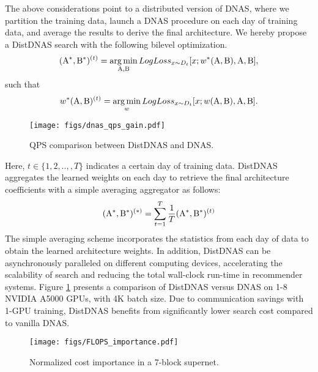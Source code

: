  The above considerations point to a distributed version of DNAS, where we partition the training data, launch a DNAS procedure on each day of training data, and average the results to derive the final architecture.
 We hereby propose a DistDNAS search with the following bilevel optimization.
\begin{equation}
\small
    (\mathrm{A}^{*}, \mathrm{B}^{*})^{(t)} = \operatorname*{arg\,min}_{\mathrm{A}, \mathrm{B}} LogLoss_{x \sim D_{t}}[x; w^{*}(\mathrm{A}, \mathrm{B}), \mathrm{A}, \mathrm{B}],
\end{equation}
such that
\begin{equation}
\small
    w^{*}(\mathrm{A}, \mathrm{B})^{(t)} = \operatorname*{arg\,min}_{w} LogLoss_{x \sim D_{t}}[x; w(\mathrm{A}, \mathrm{B}), \mathrm{A}, \mathrm{B}].
\end{equation}


\begin{figure}[t]
    \begin{center}
    \texttt{[image: figs/dnas\_qps\_gain.pdf]}
    \vspace{-1em}
    \caption{QPS comparison between DistDNAS and DNAS.}
    \label{fig:dnas_qps}
    \end{center}
    \vspace{-1em}
\end{figure}

Here, $t \in \{1, 2, ..,, T\}$ indicates a certain day of training data. 
DistDNAS aggregates the learned weights on each day to retrieve the final architecture coefficients with a simple averaging aggregator as follows:
\begin{equation}
\small
    (\mathrm{A}^{*}, \mathrm{B}^{*})^{(*)} = \sum_{t=1}^{T} \frac{1}{T}(\mathrm{A}^{*}, \mathrm{B}^{*})^{(t)}
\end{equation}
The simple averaging scheme incorporates the statistics from each day of data to obtain the learned architecture weights. 
In addition, DistDNAS can be asynchronously paralleled on different computing devices, accelerating the scalability of search and reducing the total wall-clock run-time in recommender systems. Figure \ref{fig:dnas_qps} presents a comparison of DistDNAS versus DNAS on 1-8 NVIDIA A5000 GPUs, with 4K batch size. Due to communication savings with 1-GPU training, DistDNAS benefits from significantly lower search cost compared to vanilla DNAS.



\begin{figure}[b]
    \vspace{-2em}
    \begin{center}
    \texttt{[image: figs/FLOPS\_importance.pdf]}
    \vspace{-1em}
    \caption{Normalized cost importance in a 7-block supernet.}
    \label{fig:flops_feature_interactions}    
    \end{center}
\end{figure}


